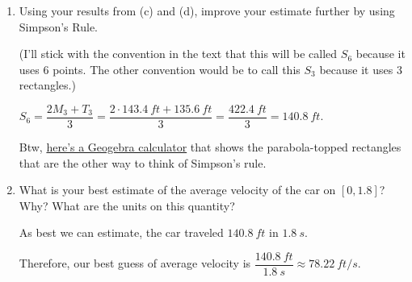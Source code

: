 \documentclass[10pt]{article}
\newenvironment{red}{\color{red}}{\ignorespacesafterend}
\begin{document}
\begin{enumerate}[leftmargin=0pt]
\item[e.] Using your results from (c) and (d), improve your estimate further by using Simpson's Rule.

\begin{red}
    (I'll stick with the convention in the text that this will be called $S_6$ because it uses 6 points. The other convention would be to call this $S_3$ because it uses 3 rectangles.)

    $S_6 = \dfrac{2 M_3 + T_3}{3} = \dfrac{2\cdot\SI{143.4}{ft} + \SI{135.6}{ft}}{3} = \dfrac{\SI{422.4}{ft}}{3} = \SI{140.8}{ft}$.

    Btw, \href{https://www.geogebra.org/calculator/epsungqr}{here's a Geogebra calculator} that shows the parabola-topped rectangles that are the other way to think of Simpson's rule.
\end{red}

\item[f.] What is your best estimate of the average velocity of the car on $[0, 1.8]$? Why? What are the units on this quantity?

\begin{red}
    As best we can estimate, the car traveled $\SI{140.8}{ft}$ in $\SI{1.8}{s}$. 
    
    Therefore, our best guess of average velocity is $\dfrac{\SI{140.8}{ft}}{\SI{1.8}{s}} \approx \SI{78.22}{ft/s}$.
\end{red}

\end{enumerate}
\end{document}
